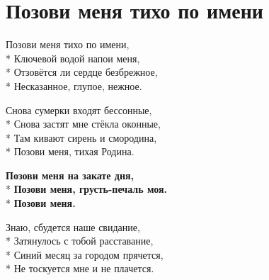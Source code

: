 \vspace{\fill}\newpage

\section{Позови меня тихо по имени}
\label{song:Позови_меня_тихо_по_имени}

\medskip

\begin{minipage}{\linewidth}
Позови меня тихо по имени,\\*
Ключевой водой напои меня,\\*
Отзовётся ли сердце безбрежное,\\*
Несказанное, глупое, нежное.\\
\end{minipage}\par\medskip\nobreak

\medskip

\begin{minipage}{\linewidth}
Снова сумерки входят бессонные,\\*
Снова застят мне стёкла оконные,\\*
Там кивают сирень и смородина,\\*
Позови меня, тихая Родина.\\
\end{minipage}\par\medskip\nobreak

\medskip

\begin{minipage}{\linewidth}
\hspace*{1.5em}\textbf{Позови меня на закате дня,}\\*
\hspace*{1.5em}\textbf{Позови меня, грусть-печаль моя.}\\*
\hspace*{1.5em}\textbf{Позови меня.}\\
\end{minipage}\par\medskip\nobreak

\medskip

\begin{minipage}{\linewidth}
Знаю, сбудется наше свидание,\\*
Затянулось с тобой расставание,\\*
Синий месяц за городом прячется,\\*
Не тоскуется мне и не плачется.\\
\end{minipage}\par\medskip\nobreak

